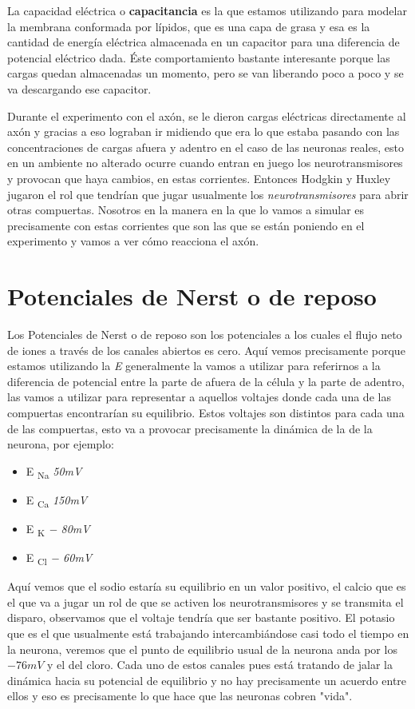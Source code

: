 La capacidad eléctrica o \textbf{capacitancia} es la que estamos utilizando para modelar la membrana conformada por lípidos, que es una capa de grasa y esa es la cantidad de energía eléctrica almacenada en un capacitor para una diferencia de potencial eléctrico dada. Éste comportamiento bastante interesante porque las cargas quedan almacenadas un momento, pero se van liberando poco a poco y se va descargando ese capacitor. 


Durante el experimento con el axón, se le dieron cargas eléctricas directamente al axón y gracias a eso lograban ir midiendo que era lo que estaba pasando con las concentraciones de cargas afuera y adentro en el caso de las neuronas reales, esto en un ambiente no alterado ocurre cuando entran en juego los neurotransmisores y provocan que haya cambios, en estas corrientes. Entonces Hodgkin y Huxley jugaron el rol que tendrían que jugar usualmente los \emph{neurotransmisores} para abrir otras compuertas. Nosotros en la manera en la que lo vamos a simular es precisamente con estas corrientes que son las que se están poniendo en el experimento y vamos a ver cómo reacciona el axón. 


\section{Potenciales de Nerst o de reposo}

Los Potenciales de Nerst o de reposo son los potenciales a los cuales el flujo neto de iones a través de los canales abiertos es cero.
Aquí vemos precisamente porque estamos utilizando la \emph{E} generalmente la vamos a utilizar para referirnos a la diferencia de potencial entre la parte de afuera de la célula y la parte de adentro, las vamos a utilizar para representar a aquellos voltajes donde cada una de las compuertas encontrarían su equilibrio. Estos voltajes son distintos para cada una de las compuertas, esto va a provocar precisamente la dinámica de la de la neurona, por ejemplo: 

\begin{itemize}
\item E \textsubscript{Na}  \emph{50mV}
\item E \textsubscript{Ca}  \emph{150mV}
\item E \textsubscript{K}   \emph{− 80mV}
\item E \textsubscript{Cl}  \emph{− 60mV}
\end{itemize}

Aquí vemos que el sodio estaría su equilibrio en un valor positivo, 
el calcio que es el que va a jugar un rol de que se activen los neurotransmisores y se transmita el disparo, observamos que el voltaje tendría que ser bastante positivo. El potasio que es el que usualmente está trabajando intercambiándose casi todo el tiempo en la neurona, veremos que el punto de equilibrio usual de la neurona anda por los $-76 mV$ y el del cloro. Cada uno de estos canales pues está tratando de jalar la dinámica hacia su potencial de equilibrio y no hay precisamente un acuerdo entre ellos y eso es precisamente lo que hace que las neuronas cobren "vida".


